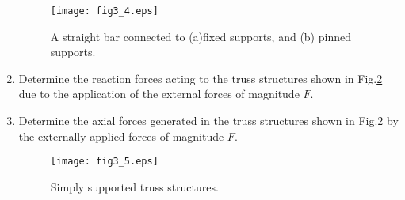 \documentclass[10pt,a4j]{article}
\begin{document}
\begin{enumerate}
\begin{figure}[h]
	\begin{center}
	\texttt{[image: fig3\_4.eps]} 
	\end{center}
	\caption{A straight bar connected to (a)fixed supports, and (b) pinned supports.} 
	\label{fig:fig3_4}
\end{figure}
\item
Determine the reaction forces acting to the truss structures shown in Fig.\ref{fig:fig3_5} 
due to the application of the external forces of magnitude $F$.
\item
Determine the axial forces generated in the truss structures shown in Fig.\ref{fig:fig3_5}
by the externally applied forces of magnitude $F$.
\begin{figure}[h]
	\begin{center}
	\texttt{[image: fig3\_5.eps]} 
	\end{center}
	\caption{Simply supported truss structures.} 
	\label{fig:fig3_5}
\end{figure}
\end{enumerate}
\end{document}
